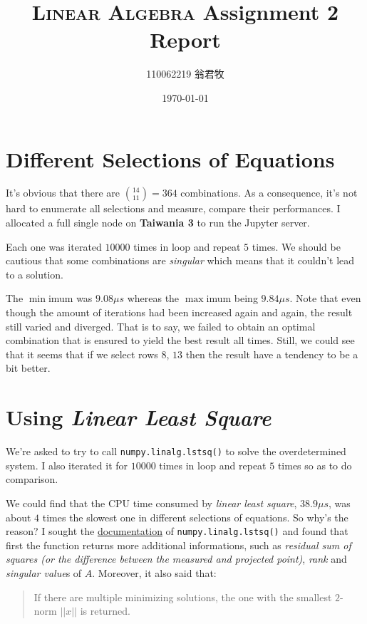 \documentclass[12pt, a4paper]{article}
\title{\textsc{Linear Algebra} Assignment 2 Report}
\author{110062219 翁君牧}
\date{\today}
\begin{document}
\maketitle

\tableofcontents
\listoffigures

\section{Different Selections of Equations}

It's obvious that there are \(\binom{14}{11}=364\) combinations. As a consequence, it's not hard to enumerate all selections and measure, compare their performances. I allocated a full single node on \textbf{Taiwania 3} to run the \textsf{Jupyter} server.

Each one was iterated \(10000\) times in loop and repeat \(5\) times. We should be cautious that some combinations are \emph{singular} which means that it couldn't lead to a solution.

The \(\min\)imum was \(9.08\mu s\) whereas the \(\max\)imum being \(9.84\mu s\). Note that even though the amount of iterations had been increased again and again, the result still varied and diverged. That is to say, we failed to obtain an optimal combination that is ensured to yield the best result all times. Still, we could see that it seems that if we select rows \(8\), \(13\) then the result have a tendency to be a bit better.

\section{Using \itshape Linear Least Square}

We're asked to try to call \texttt{numpy.linalg.lstsq()} to solve the overdetermined system. I also iterated it for \(10000\) times in loop and repeat \(5\) times so as to do comparison.

We could find that the CPU time consumed by \emph{linear least square}, \(38.9\mu s\), was about \(4\) times the slowest one in different selections of equations. So why's the reason? I sought the \href{https://numpy.org/doc/stable/reference/generated/numpy.linalg.lstsq.html}{documentation} of \texttt{numpy.linalg.lstsq()} and found that first the function returns more additional informations, such as \emph{residual sum of squares (or \emph{the difference between the measured and projected point})}, \emph{rank} and \emph{singular value}s of $A$. Moreover, it also said that: \begin{quote} If there are multiple minimizing solutions, the one with the smallest \(2\)-norm \(||x||\) is returned. \end{quote}
\end{document}
